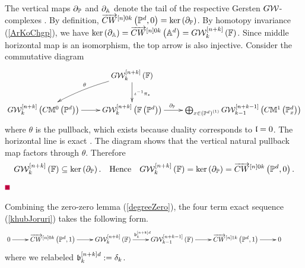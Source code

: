 \documentclass[12pt]{article}
\begin{document}
  The vertical maps $\partial_{{\mathbb{P}}}$ and $\partial_{{\mathbb{A}}}$ denote the tail of the respective Gersten ${G}{\mathcal{W}}$-complexes
  \cite[pp 473]{M23}. By definition,
  $\overrightarrow{CW}^{\left[ n\right]0k}\left( {\mathbb{P}}^d, 0\right)=\ker\left( \partial_{{\mathbb{P}}}\right)$. 
  By homotopy invariance (\ref{ArKoChgp}), we have 
  $\ker\left( \partial_{{\mathbb{A}}}\right)=\overrightarrow{CW}^{\left[ n\right]0k}\left( {\mathbb{A}}^d\right)= G{\mathcal{W}}_k^{\left[ n+k\right]}\left( {\mathbb{F}}\right)$. Since middle horizontal map is an isomorphism, the top arrow is also injective. 
% 
  Consider the commutative diagram %
  $$
  \diagram 
  &G{\CW}^{\LRt{n+k}}_k\LRf{{\BF}}\ar[d]^{\iota^{-1}\pi_*}\ar@/_/[dl]_{\theta}&\\
  G{\CW}_k^{\LRt{n+k}}\LRf{C{\BM}^0\LRf{{\BP}^d}} \ar[r] &  
  G{\CW}_k^{\LRt{n+k}}\LRf{{\BF}\LRf{{\BP}^d}} \ar[r]^{\partial_{\BP}\qquad\qquad} & 
   \bigoplus_{x\in \LRf{{\BP}^d}^{\LRf{1}}}   G{\CW}_{k-1}^{\LRt{n+k-1}}\LRf{C{\BM}^1\LRf{{\BP}^d_x}} \\
  \enddiagram
  $$
  where $\theta$ is the pullback, which exists because duality corresponds to $\mathfrak {l}=0$.
  The horizontal line is exact \cite[pp 473]{M23}.
  The diagram shows that the vertical natural pullback map factors through $\theta$. Therefore
  $$
  G{\mathcal{W}}^{\left[ n+k\right]}_k\left( {\mathbb{F}}\right) \subseteq   \ker\left( \partial_{{\mathbb{P}}}\right). \quad {\rm Hence}
  \quad   G{\mathcal{W}}^{\left[ n+k\right]}_k\left( {\mathbb{F}}\right) =   \ker\left( \partial_{{\mathbb{P}}}\right)=
  \overrightarrow{CW}^{\left[ n\right]0k}\left( {\mathbb{P}}^d, 0\right).
  $$
\pic $\eop$

\vspace{3mm}
Combining the zero-zero lemma (\ref{degreeZero}), the four term exact sequence (\ref{khubJoruri}) takes the following form.
\begin{equation}\label{zeroHero10}
  \diagram
 0 \ar[r] & 
 \ora{CW}^{\LRt{n}0k}\LRf{{\BP}^d, 1} \ar[r] &  G{\CW}^{\LRt{n+k}}_k\LRf{{\BF}} \ar[r]^{\b^{\LRt{n+k}d}_{k}} & 
G{\CW}^{\LRt{n+k-1}}_{k-1}\LRf{{\BF}} \ar[r] &
 \ora{CW}^{\LRt{n}1k}\LRf{{\BP}^d, 1} \ar[r] & 0 &\\
 \enddiagram
  \end{equation} 
  where we relabeled $\mathfrak {b}^{\left[ n+k\right]d}_{k}:=\delta_k$. 
  
  
\end{document}
